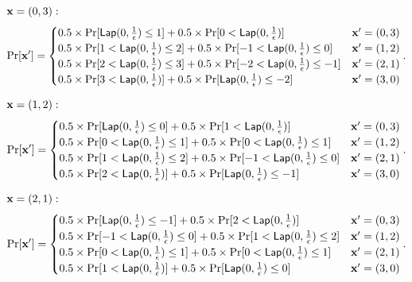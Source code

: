 \documentclass{article}
\begin{document}
{\small

\noindent $\textbf{x} = (0,3):$
\[
\Pr[\dataobs']
= \begin{cases}
	0.5 \times 
 	\Pr[	\lap{0}{\frac{1}{\epsilon}}	\leq	1] 
 	+ 	
 	0.5 \times 
 	\Pr[	0	< \lap{0}{\frac{1}{\epsilon}}] 
%
	& \dataobs' = (0, 3)\\
%
 	0.5 \times 
 	\Pr[	1	< \lap{0}{\frac{1}{\epsilon}}	\leq	2] 
 	+ 	
 	0.5 \times 
 	\Pr[	-1	< \lap{0}{\frac{1}{\epsilon}}	\leq	0] 
%
	& \dataobs' = (1, 2)\\
%
 	0.5 \times 
 	\Pr[	2	<	\lap{0}{\frac{1}{\epsilon}}	\leq	3] 
 	+ 	
 	0.5 \times 
 	\Pr[	-2	< \lap{0}{\frac{1}{\epsilon}}	\leq	-1] 
%
	& \dataobs' = (2, 1)\\
%
 	0.5 \times 
 	\Pr[	3	<	\lap{0}{\frac{1}{\epsilon}}]
 	+ 	
 	0.5 \times 
 	\Pr[	\lap{0}{\frac{1}{\epsilon}}	\leq	-2] 
%
& \dataobs' = (3, 0)
\end{cases}.
\]


\noindent $\textbf{x} = (1,2):$
\[
\Pr[\dataobs']
= \begin{cases}
 	0.5 \times 
 	\Pr[	\lap{0}{\frac{1}{\epsilon}}	\leq	0] 
 	+ 	
 	0.5 \times 
 	\Pr[	1	< \lap{0}{\frac{1}{\epsilon}}] 
	& \dataobs' = (0, 3)\\
%
 	0.5 \times 
 	\Pr[	0	< \lap{0}{\frac{1}{\epsilon}}	\leq	1] 
 	+ 	
 	0.5 \times 
 	\Pr[	0	< \lap{0}{\frac{1}{\epsilon}}	\leq	1] 
	& \dataobs' = (1, 2)\\
%
 	0.5 \times 
 	\Pr[	1	<	\lap{0}{\frac{1}{\epsilon}}	\leq	2] 
 	+ 	
 	0.5 \times 
 	\Pr[	-1	< \lap{0}{\frac{1}{\epsilon}}	\leq	0] 
	& \dataobs' = (2, 1)\\
%
 	0.5 \times 
 	\Pr[	2	<	\lap{0}{\frac{1}{\epsilon}}] 
 	+ 	
 	0.5 \times 
 	\Pr[	\lap{0}{\frac{1}{\epsilon}}	\leq	-1] 
	& \dataobs' = (3, 0)
\end{cases}.
\]

\noindent $\textbf{x} = (2,1):$
\[
\Pr[\dataobs']
= \begin{cases}
 	0.5 \times 
 	\Pr[	\lap{0}{\frac{1}{\epsilon}}	\leq	-1]
 	+ 	
 	0.5 \times 
 	\Pr[	2	< \lap{0}{\frac{1}{\epsilon}}] 
%
	& \dataobs' = (0, 3)\\
%
 	0.5 \times 
 	\Pr[	-1	< \lap{0}{\frac{1}{\epsilon}}	\leq	0] 
 	+ 	
 	0.5 \times 
 	\Pr[	1	< \lap{0}{\frac{1}{\epsilon}}	\leq	2] 
%
	& \dataobs' = (1, 2)\\
%
 	0.5 \times 
 	\Pr[	0	<	\lap{0}{\frac{1}{\epsilon}}	\leq	1] 
 	+ 	
 	0.5 \times 
 	\Pr[	0	< \lap{0}{\frac{1}{\epsilon}}	\leq	1] 
%
& \dataobs' = (2, 1)\\
%
 	0.5 \times 
 	\Pr[	1	<	\lap{0}{\frac{1}{\epsilon}}	] 
 	+ 	
 	0.5 \times 
 	\Pr[	\lap{0}{\frac{1}{\epsilon}}	\leq	0] 
%
& \dataobs' = (3, 0)
\end{cases}.
\]



}
\end{document}
